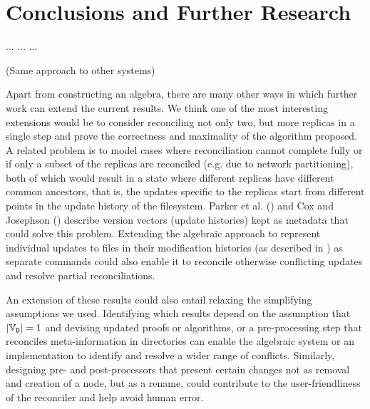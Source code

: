 
\section{Conclusions and Further Research}

... ... ...

(Same approach to other systems)
\medskip


Apart from constructing an algebra,
there are many other ways in which further work can extend the current results.
We think one of the most interesting extensions would be to
consider reconciling not only two, but more replicas in a single step and
prove the correctness and maximality of the algorithm proposed.
A related problem is to model cases where reconciliation cannot
complete fully
or if only a subset of the replicas are reconciled 
(e.g. due to network partitioning),
both of which would result in a state where different replicas
have different common ancestors, that is,
the updates specific to the replicas start from different points
in the update history of the filesystem.
Parker et al. (\cite{PPRS}) and Cox and Josephson (\cite{CJ})
describe version vectors (update histories) kept as metadata that could solve this problem.
Extending the algebraic approach to represent individual updates to files
in their modification histories (as described in \cite{CJ})
as separate commands could also enable it to reconcile otherwise
conflicting updates and resolve partial reconciliations.

An extension of these results could also entail relaxing
the simplifying assumptions we used.
Identifying which results depend on the assumption that $|\mathbb{V}_{\mathtt{D}}|=1$
and devising updated proofs or algorithms,
or a pre-processing step that reconciles meta-information in directories
can enable the algebraic system or an implementation
to identify and resolve a wider range of conflicts.
Similarly, designing pre- and post-processors that
present certain changes not as removal and creation of a node,
but as a rename,
could contribute to the user-friendliness of the reconciler
and help avoid human error.
